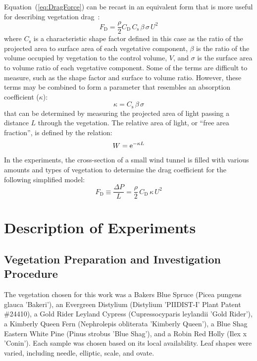 \documentclass[12pt]{article}
\begin{document}
Equation~(\ref{eq:DragForce}) can be recast in an equivalent form that is more useful for describing vegetation drag~\cite{Mueller2014}:
\begin{equation}
\label{eq:DragForcea}
F_{\mathrm{D}}  = \frac{\rho}{2} C_{\mathrm{D}} \, C_{\mathrm{s}} \, \beta \, \sigma \, U^2
\end{equation}
where $C_{\mathrm{s}}$ is a characteristic shape factor defined in this case as the ratio of the projected area to surface area of each vegetative component, $\beta$ is the ratio of the volume occupied by vegetation to the control volume, $V$, and $\sigma$ is the surface area to volume ratio of each vegetative component. Some of the terms are difficult to measure, such as the shape factor and surface to volume ratio. However, these terms may be combined to form a parameter that resembles an absorption coefficient ($\kappa$):
\begin{equation}
\label{eq:Kappa} 
\kappa = C_{\mathrm{s}} \, \beta \, \sigma 
\end{equation}
that can be determined by measuring the projected area of light passing a distance $L$ through the vegetation. The relative area of light, or ``free area fraction'', is defined by the relation:
\begin{equation}\label{eq:WhiteFraction}
W = {\rm e}^{-\kappa L}
\end{equation}
In the experiments, the cross-section of a small wind tunnel is filled with various amounts and types of vegetation to determine the drag coefficient for the following simplified model:
\begin{equation}\label{eq:Pressure}
F_{\mathrm{D}} \equiv \frac{\Delta P}{L}  = \frac{\rho}{2} \, C_{\mathrm{D}} \, \kappa \, U^2
\end{equation}



\section{Description of Experiments}
\label{sec:Experiments}
\subsection{Vegetation Preparation and Investigation Procedure}
\label{ssec:headingscap}

The vegetation chosen for this work was a Bakers Blue Spruce (Picea pungens glauca 'Bakeri'), an Evergreen Distylium (Distylium 'PIIDIST-I' Plant Patent \#24410), a Gold Rider Leyland Cypress (Cupressocyparis leylandii 'Gold Rider'), a Kimberly Queen Fern (Nephrolepis obliterata 'Kimberly Queen'), a Blue Shag Eastern White Pine (Pinus strobus 'Blue Shag'), and a Robin Red Holly (Ilex x 'Conin'). Each sample was chosen based on its local availability. Leaf shapes were varied, including needle, elliptic, scale, and ovate.
\end{document}
